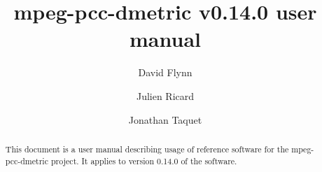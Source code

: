 \documentclass[a4paper,11pt]{mpegdoc}
\title{mpeg-pcc-dmetric v0.14.0 user manual}
\author{%
David Flynn \email{davidflynn@apple.com}
\and
Julien Ricard \email{julien.ricard@interdital.com}
\and
Jonathan Taquet \email{jonathant@xiaomi.com}
}
\begin{document}
\maketitle
\begin{abstract}
This document is a user manual describing usage of reference software
for the mpeg-pcc-dmetric project. It applies to version 0.14.0 of the software.
\end{abstract}
\newpage
\tableofcontents

\newpage







%
\end{document}
